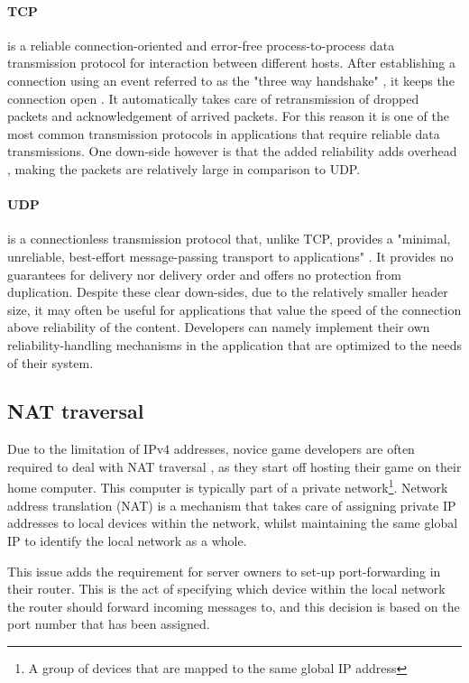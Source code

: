 \documentclass[bsc, 12pt, twoside, singlespacing, parskip, abbrevs, notimes, normalheadings, logo, deptreport]{styles/infthesis}
\begin{document}
\paragraph*{TCP} is a reliable connection-oriented and error-free process-to-process data transmission protocol for interaction between different hosts. After establishing a connection using an event referred to as the "three way handshake" \cite{handshake}, it keeps the connection open \cite{tcp_open_connection}. It automatically takes care of retransmission of dropped packets and acknowledgement of arrived packets. For this reason it is one of the most common transmission protocols in applications that require reliable data transmissions. One down-side however is that the added reliability adds overhead \cite{Multiplayer_Networking_modern_engine}, making the packets are relatively large in comparison to UDP.

\paragraph*{UDP} is a connectionless transmission protocol that, unlike TCP, provides a "minimal, unreliable, best-effort message-passing transport to applications" \cite{udp_connectionless}. It provides no guarantees for delivery nor delivery order and offers no protection from duplication. Despite these clear down-sides, due to the relatively smaller header size, it may often be useful for applications that value the speed of the connection above reliability of the content. Developers can namely implement their own reliability-handling mechanisms in the application that are optimized to the needs of their system.

\subsection{NAT traversal}
Due to the limitation of IPv4 addresses, novice game developers are often required to deal with NAT traversal \cite{NAT}, as they start off hosting their game on their home computer. This computer is typically part of a private network\footnote{A group of devices that are mapped to the same global IP address}. Network address translation (NAT) is a mechanism that takes care of assigning private IP addresses to local devices within the network, whilst maintaining the same global IP to identify the local network as a whole.

This issue adds the requirement for server owners to set-up port-forwarding in their router. This is the act of specifying which device within the local network the router should forward incoming messages to, and this decision is based on the port number that has been assigned.
\end{document}
